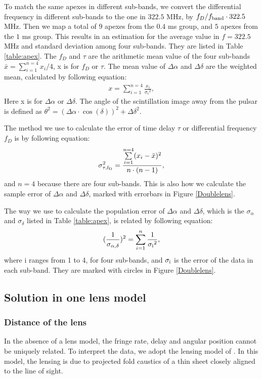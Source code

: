 \documentclass[useAMS,usenatbib]{mn2e}
\begin{document}
To match the same apexes in different sub-bands, we convert the differential frequency in different sub-bands to the one in $322.5$ MHz, by $f_D/f_{\rm band}\cdot322.5$ MHz. Then we map
a total of $9$ apexes from the $0.4$ ms group, and $5$ apexes from the $1$ ms
group. This results in an estimation
for the average value in $f=322.5$ MHz and standard deviation among four sub-bands. They are listed in Table
\ref{table:apex}. The $f_D$ and $\tau$ are the arithmetic mean value of the four sub-bands $\bar{x}={\sum\limits^{n=4}_{i=1}{x_i}}/{4}$, x is for $f_D$ or $\tau$.
The mean value of $\Delta\alpha$ and $\Delta\delta$ are the weighted mean, calculated by following equation:
\begin{align*}
x=\sum\limits^{n=4}_{i=1}\frac{x_i}{{\sigma_i}^2},
\end{align*}
Here x is for $\Delta\alpha$ or $\Delta\delta$. The angle of the scintillation image away from the pulsar is defined as ${\theta}^2=({\Delta\alpha}\cdot\cos(\delta))^2+{\Delta\delta}^2$. 

The method we use to calculate the error of time delay $\tau$ or differential frequency $f_D$ is by following equation:
\begin{align*}
{\sigma^2_{\rm \tau, f_D}} = \frac{\sum\limits^{n=4}_{i=1}(x_i-\bar{x})^2}{n\cdot(n-1)},
\end{align*}
and $n=4$ because there are four sub-bands. This is also how we calculate the sample error of $\Delta\alpha$ and $\Delta\delta$, marked with errorbars in Figure \ref{Doublelens}.

The way we use to calculate the population error of $\Delta\alpha$ and $\Delta\delta$, which is the $\sigma_{\alpha}$ and $\sigma_{\delta}$ listed in Table \ref{table:apex}, is related by following equation:
\begin{align*}
(\frac{1}{\sigma_{\rm \alpha, \delta}})^2 = \sum\limits^n_{i=1}{\frac{1}{{ \rm \sigma_i}^2}},
\end{align*}
where i ranges from 1 to 4, for four sub-bands, and $\rm \sigma_i$ is the error of the data in each sub-band. They are marked with circles in Figure \ref{Doublelens}.

\subsection{Solution in one lens model}
\subsubsection{Distance of the lens}
In the absence of a lens model, the
fringe rate, delay and angular position cannot be uniquely related. To interpret the data, we adopt the lensing model of
\citep{2014MNRAS.442.3338P}.  In this model, the lensing is due to projected fold caustics of a thin sheet closely aligned to the line of sight. 
\end{document}
